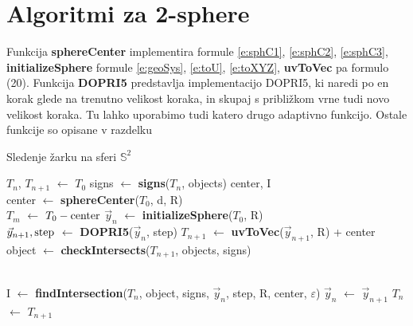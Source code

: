 \documentclass[titlepage]{article}
\begin{document}
\section{Algoritmi za 2-sphere}
Funkcija \textbf{sphereCenter} implementira formule \eqref{e:sphC1}, \eqref{e:sphC2}, \eqref{e:sphC3}, \textbf{initializeSphere} formule \eqref{e:geoSys}, \eqref{e:toU}, \eqref{e:toXYZ}, \textbf{uvToVec} pa formulo (20). Funkcija \textbf{DOPRI5} predstavlja implementacijo DOPRI5, ki naredi po en korak glede na trenutno velikost koraka, in skupaj s približkom vrne tudi novo velikost koraka. Tu lahko uporabimo tudi katero drugo adaptivno funkcijo. Ostale funkcije so opisane v
razdelku 
\begin{algorithm}
    \caption{Sledenje žarku na sferi \(\mathbb{S}^{2}\)}
\begin{algorithmic}

    \State $T_{n}$, $T_{n+1}$ $\gets$ $T_{0}$
    \State signs $\gets$ \textbf{signs}($T_{n}$, objects)
    \State center, I
    \\
    \State {}
      \State center $\gets$ \textbf{sphereCenter}($T_{0}$, d, R)
      \\
      \State $T_{m}$ $\gets$ $T_{0} - \hbox{center}$
      \State $\vec{y}_{n}$ $\gets$ \textbf{initializeSphere}($T_{0}$, R)
    \EndIf
    \\
    \State $\vec{y}_{n+1}, \hbox{step}$ $\gets$ \textbf{DOPRI5}($\vec{y}_{n}$, step)
    \State $T_{n+1}$ $\gets$ \textbf{uvToVec}($\vec{y}_{n+1}$, R) + center
    \\
    \State object $\gets$ \textbf{checkIntersects}($T_{n+1}$, objects, signs)
    \\
    \\

      \State I $\gets$ \textbf{findIntersection}($T_{n}$, object, signs, $\vec{y}_{n}$, step, R, center, $\varepsilon$)
      \State {}
    \Else
      \State $\vec{y}_{n}$ $\gets$ $\vec{y}_{n+1}$
      \State $T_{n}$ $\gets$ $T_{n+1}$
    \EndIf
  \EndWhile
\EndFunction
\end{algorithmic}
\end{algorithm}
\end{document}
